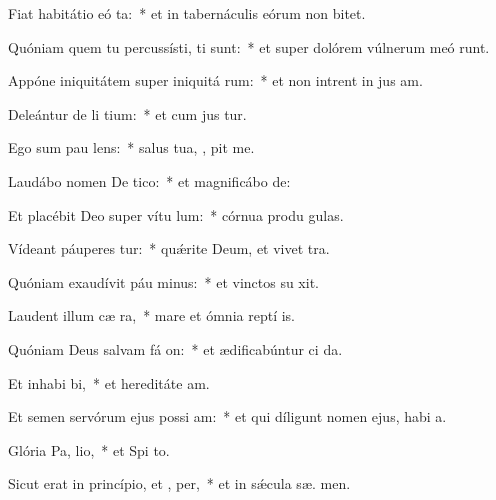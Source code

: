 \item Fiat habitátio eó ta:~* et in tabernáculis eórum non   bitet.
\item Quóniam quem tu percussísti, ti sunt:~* et super dolórem vúlnerum meó runt.
\item Appóne iniquitátem super iniquitá rum:~* et non intrent in jus am.
\item Deleántur de li tium:~* et cum jus  tur.
\item Ego sum pau  lens:~* salus tua, , pit me.
\item Laudábo nomen De  tico:~* et magnificábo   de:
\item Et placébit Deo super vítu lum:~* córnua produ  gulas.
\item Vídeant páuperes  tur:~* quǽrite Deum, et vivet  tra.
\item Quóniam exaudívit páu minus:~* et vinctos su  xit.
\item Laudent illum cæ  ra,~* mare et ómnia reptí  is.
\item Quóniam Deus salvam fá on:~* et ædificabúntur ci da.
\item Et inhabi bi,~* et hereditáte  am.
\item Et semen servórum ejus possi am:~* et qui díligunt nomen ejus, habi  a.
\item Glória Pa,  lio,~* et Spi to.
\item Sicut erat in princípio, et ,  per,~* et in sǽcula sæ. men.
